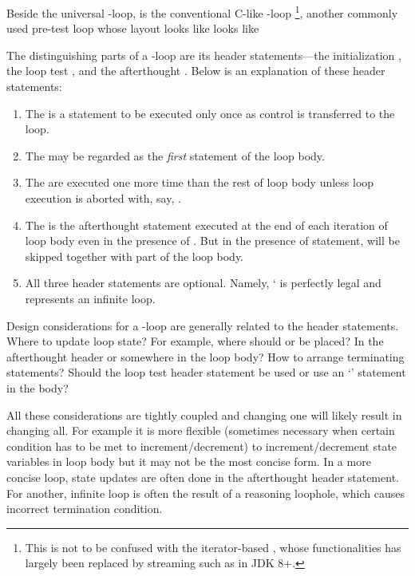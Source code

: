 Beside the universal -loop, is the conventional C-like -loop
\footnote{This is not to be confused with the iterator-based ,
whose functionalities has largely been replaced by streaming such as in JDK 8+.},
another commonly used pre-test loop whose layout looks like looks like

The distinguishing parts of a -loop are its header statements---the
initialization , the loop test , and the afterthought .
Below is an explanation of these header statements:
\begin{enumerate}
    \item The  is a statement to be executed only once as control is transferred to
    the loop.
    \item The  may be regarded as the \emph{first} statement of the loop body.
    \item The  are executed one more time than the rest of loop body
    unless loop execution is aborted with, say, .
    \item The  is the afterthought statement executed at the end of each
    iteration of loop body even in the presence of .
    But in the presence of  statement,  will be skipped together with
    part of the loop body.
    \item All three header statements are optional.
    Namely, ` is perfectly legal and represents an infinite loop.
\end{enumerate}


Design considerations for a -loop are generally related to the header statements.
Where to update loop state?
For example, where should  or  be placed?
In the afterthought header or somewhere in the loop body?
How to arrange terminating statements?
Should the loop test header statement be used or use an `' statement in the body?


All these considerations are tightly coupled and changing one will likely result in changing all.
For example it is more flexible (sometimes necessary when certain condition
has to be met to increment/decrement)
to increment/decrement state variables in loop body but it may not be the most concise form.
In a more concise loop, state updates are often done in the afterthought header statement.
For another, infinite loop is often the result of a reasoning loophole,
which causes incorrect termination condition.


